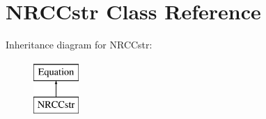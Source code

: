 \hypertarget{class_open_chams_1_1_n_r_c_cstr}{\section{N\-R\-C\-Cstr Class Reference}
\label{class_open_chams_1_1_n_r_c_cstr}
}
Inheritance diagram for N\-R\-C\-Cstr\-:\begin{figure}[H]
\begin{center}
\leavevmode
\includegraphics[height=2.000000cm]{class_open_chams_1_1_n_r_c_cstr}
\end{center}
\end{figure}
